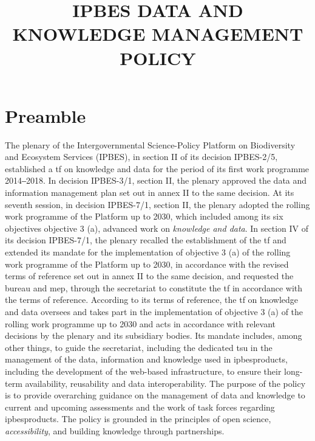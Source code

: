 \documentclass{article}
\title{IPBES DATA AND KNOWLEDGE MANAGEMENT POLICY}
\begin{document}


% 


\tableofcontents

\newpage





\section{Preamble}

The \gls{plenary} of the Intergovernmental Science-Policy Platform on Biodiversity and Ecosystem Services (IPBES), in section II of its decision IPBES-2/5, established a \gls{tf} on knowledge and data for the period of its first work programme 2014‒2018. In decision IPBES-3/1, section II, the \gls{plenary} approved the data and information management plan set out in annex II to the same decision. At its seventh session, in decision IPBES-7/1, section II, the \gls{plenary} adopted the rolling work programme of the Platform up to 2030, which included among its six objectives objective 3 (a), advanced work on \textit{knowledge and data}. In section IV of its decision IPBES-7/1, the \gls{plenary} recalled the establishment of the \gls{tf} and extended its mandate for the implementation of objective 3 (a) of the rolling work programme of the Platform up to 2030, in accordance with the revised terms of reference set out in annex II to the same decision, and requested the \gls{bureau} and \gls{mep}, through the \gls{secretariat} to constitute the \gls{tf} in accordance with the terms of reference. According to its terms of reference, the \gls{tf} on knowledge and data oversees and takes part in the implementation of objective 3 (a) of the rolling work programme up to 2030 and acts in accordance with relevant decisions by the \gls{plenary} and its subsidiary bodies. Its mandate includes, among other things, to guide the \gls{secretariat}, including the dedicated \gls{tsu} in the management of the \gls{data}, information and knowledge used in \glspl{ipbesproduct}, including the development of the web-based infrastructure, to ensure their long-term availability, reusability and data interoperability. The purpose of the policy is to provide overarching guidance on the management of data and knowledge to current and upcoming assessments and the work of task forces regarding \glspl{ipbesproduct}. The policy is grounded in the principles of open science, \textit{accessibility}, and building knowledge through partnerships.
\end{document}

